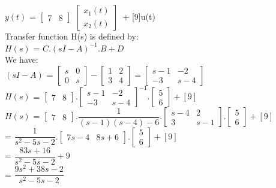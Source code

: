 \documentclass[14pt,a4paper]{article}
\begin{document}
\begin{enumerate}
	$y(t)$ = $\begin{bmatrix} 7&8 \end{bmatrix}$ $\begin{bmatrix} x_1(t)\\x_2(t) \end{bmatrix}$\ + [9]u(t) \\
	
	Transfer function H(s) is defined by: \\
	$H(s)$ = $C.(sI-A)^{-1}.B + D$ \\
	We have: \\
	$(sI-A)$ = $\begin{bmatrix} s&0 \\ 0&s	\end{bmatrix} - \begin{bmatrix}
	1&2 \\ 3&4 \end{bmatrix} = \begin{bmatrix} s-1 & -2 \\ -3 & s-4	\end{bmatrix}$\\
	
	$H(s)$ = $\begin{bmatrix}7&8\end{bmatrix}.\begin{bmatrix} s-1&-2 \\-3&s-4 \end{bmatrix}^{-1}. \begin{bmatrix} 5\\6 \end{bmatrix} + [9]$ \\
	
	$H(s)$ = $\begin{bmatrix}7&8\end{bmatrix}. \dfrac{1}{(s-1)(s-4)-6}.\begin{bmatrix} s-4 & 2 \\ 3 & s-1	\end{bmatrix} .\begin{bmatrix} 5\\6 \end{bmatrix} + [9]$ \\
	
		= $\dfrac{1}{s^2 - 5s - 2}. \begin{bmatrix} 7s-4 & 8s+6 \end{bmatrix}.\begin{bmatrix} 5\\6 \end{bmatrix} + [9]$ \\
		= $\dfrac{83s+16}{s^2 -5s - 2} + 9$ \\
		= $\dfrac{9s^2+38s-2}{s^2-5s-2} $\\
\end{enumerate}
\pagebreak
\end{document}
